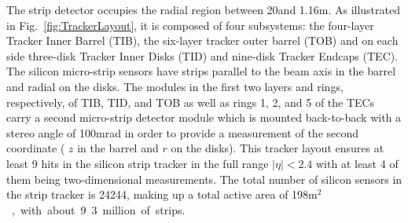 The strip detector occupies the radial region between 20\cm and 1.16\unit{m}. As illustrated in Fig.~\ref{fig:TrackerLayout}, it is composed of four subsystems: the four-layer Tracker Inner Barrel (TIB), the six-layer tracker outer barrel (TOB) and on each side three-disk Tracker Inner Disks (TID) and nine-disk Tracker Endcaps (TEC). The silicon micro-strip sensors have strips parallel to the beam axis in the barrel and radial on the disks. The modules in the first two layers and rings, respectively, of TIB, TID, and TOB as well as rings 1, 2, and 5 of the TECs carry a second micro-strip detector module which is mounted back-to-back with a stereo angle of 100\unit{mrad} in order to provide a measurement of the second coordinate ( $z$ in the barrel and $r$ on the disks). This tracker layout ensures at least 9 hits in the silicon strip tracker in the full range $|\eta| < 2.4$ with at least 4 of them being two-dimensional measurements. The total number of silicon sensors in the strip tracker is 24244, making up a total active area of 198\unit{m$^2$}, with about 9.3 million of strips.

